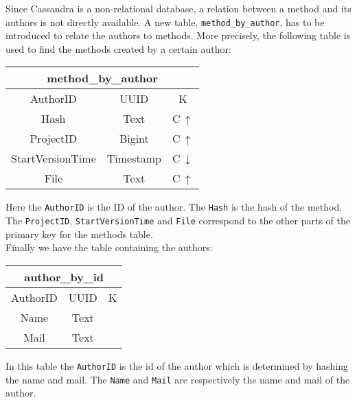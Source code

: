 \documentclass[../Main.tex]{subfiles}
\begin{document}
Since Cassandra is a non-relational database, a relation between a method and its authors is not directly available. A new table, \texttt{method\_by\_author}, has to be introduced to relate the authors to methods. More precisely, the following table is used to find the methods created by a certain author:

\begin{table}[h]
    \centering
\begin{tabular}{|ccc|}
\hline
    \multicolumn{3}{|c|}{\textbf{method\_by\_author}}   \\
    \hline
    AuthorID & UUID & K \\
    Hash & Text & C\,$\uparrow$\\
    ProjectID & Bigint & C\,$\uparrow$\\
    StartVersionTime & Timestamp & C\,$\downarrow$\\
    File & Text & C\,$\uparrow$\\
    \hline
\end{tabular}
\end{table}

Here the \texttt{AuthorID} is the ID of the author. The \texttt{Hash} is the hash of the method. The \texttt{ProjectID}, \texttt{StartVersionTime} and \texttt{File} correspond to the other parts of the primary key for the methods table.\\

Finally we have the table containing the authors:

\begin{table}[h]
\centering
\begin{tabular}{|ccc|}
\hline
    \multicolumn{3}{|c|}{\textbf{author\_by\_id}}   \\
    \hline
    AuthorID & UUID & K \\
    Name & Text & \\
    Mail & Text & \\
    \hline
\end{tabular}
\end{table}

In this table the \texttt{AuthorID} is the id of the author which is determined by hashing the name and mail. The \texttt{Name} and \texttt{Mail} are respectively the name and mail of the author.
\end{document}
